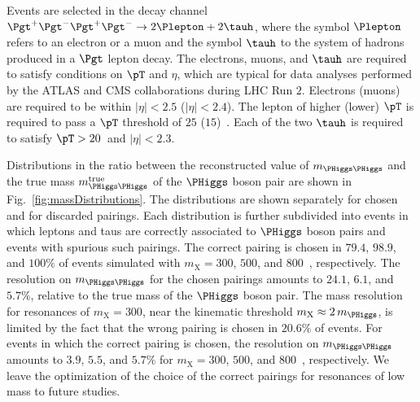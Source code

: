 Events are selected in the decay channel $\Pgt^{+}\Pgt^{-}\Pgt^{+}\Pgt^{-} \to 2\Plepton + 2\tauh$, 
where the symbol $\Plepton$ refers to an electron or a muon and the symbol $\tauh$ to the system of hadrons
produced in a $\Pgt$ lepton decay.
The electrons, muons, and $\tauh$ are required to satisfy conditions on $\pT$ and $\eta$, 
which are typical for data analyses performed by the ATLAS and CMS collaborations during LHC Run $2$.
Electrons (muons) are required to be within $\vert\eta\vert < 2.5$ ($\vert\eta\vert < 2.4$).
The lepton of higher (lower) $\pT$ is required to pass a $\pT$ threshold of $25$ ($15$)~\GeV.
Each of the two $\tauh$ is required to satisfy $\pT > 20$~\GeV and $\vert\eta\vert < 2.3$.

Distributions in the ratio between the reconstructed value of $m_{\PHiggs\PHiggs}$ 
and the true mass $m_{\PHiggs\PHiggs}^{\textrm{true}}$ of the $\PHiggs$ boson pair are shown in Fig.~\ref{fig:massDistributions}.
The distributions are shown separately for chosen and for discarded pairings.
Each distribution is further subdivided into events in which leptons and taus are correctly associated to $\PHiggs$ boson pairs and events with spurious such pairings.
The correct pairing is chosen in $79.4$, $98.9$, and $100\%$ of events simulated with $m_{\textrm{X}} = 300$, $500$, and $800$~\GeV, respectively.
The resolution on $m_{\PHiggs\PHiggs}$ for the chosen pairings amounts to $24.1$, $6.1$, and $5.7\%$,
relative to the true mass of the $\PHiggs$ boson pair.
The mass resolution for resonances of $m_{\textrm{X}} = 300$, near the kinematic threshold $m_{\textrm{X}} \approx 2 \, m_{\PHiggs}$,
is limited by the fact that the wrong pairing is chosen in $20.6\%$ of events.
For events in which the correct pairing is chosen, the resolution on $m_{\PHiggs\PHiggs}$ amounts to $3.9$, $5.5$, and $5.7\%$
for $m_{\textrm{X}} = 300$, $500$, and $800$~\GeV, respectively.
We leave the optimization of the choice of the correct pairings for resonances of low mass to future studies.

